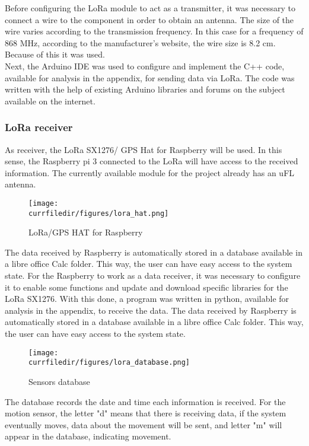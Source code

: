 Before configuring the LoRa module to act as a transmitter, it was necessary to connect a wire to the component in order to obtain an antenna. The size of the wire varies according to the transmission frequency. In this case for a frequency of 868 MHz, according to the manufacturer's website, the wire size is 8.2 cm. Because of this it was used.\\
Next, the Arduino IDE was used to configure and implement the C++ code, available for analysis in the appendix, for sending data via LoRa. The code was written with the help of existing Arduino libraries and forums on the subject available on the internet.

\newpage
\subsubsection{LoRa receiver}
As receiver, the LoRa SX1276/ GPS Hat for Raspberry will be used. In this sense, the Raspberry pi 3 connected to the LoRa will have access to the received information. The currently available module for the project already has an uFL antenna.

\begin{figure}[!h]
    \centering
    \texttt{[image: \\currfiledir/figures/lora\_hat.png]}
    \caption{LoRa/GPS HAT for Raspberry}
    \cite{Lora}
\end{figure}

The data received by Raspberry is automatically stored in a database available in a libre office Calc folder. This way, the user can have easy access to the system state.
For the Raspberry to work as a data receiver, it was necessary to configure it to enable some functions and update and download specific libraries for the LoRa SX1276. With this done, a program was written in python, available for analysis in the appendix, to receive the data. The data received by Raspberry is automatically stored in a database available in a libre office Calc folder. This way, the user can have easy access to the system state.\\

\begin{figure}
    \centering
    \texttt{[image: \\currfiledir/figures/lora\_database.png]}
    \caption{Sensors database}
\end{figure}

The database records the date and time each information is received. For the motion sensor, the letter "d" means that there is receiving data, if the system eventually moves, data about the movement will be sent, and letter "m" will appear in the database, indicating movement.


